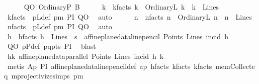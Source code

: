 \begin{isabellebody}
\ \ \ \ \isamarkupfalse%
\ QO{\isacharcolon}{\kern0pt}\ {\isacharparenleft}{\kern0pt}OrdinaryP\ B{\isacharparenright}{\kern0pt}\isanewline
\ \ \ \ \isamarkupfalse%
\ k{}\ \ k{}{\isacharunderscore}{\kern0pt}facts{\isacharcolon}{\kern0pt}\ {\isachardoublequoteopen}k\ {\isacharequal}{\kern0pt}\ OrdinaryL\ k{}\ {\isasymand}\ k{}\ {\isasymin}\ Lines{\isachardoublequoteclose}\ \isamarkupfalse%
\ k{\isacharunderscore}{\kern0pt}facts\ \ pLdef\ pm\ PI\ QO\ \isamarkupfalse%
\ auto\isanewline
\ \ \ \ \isamarkupfalse%
\ n{}\ \ n{}{\isacharunderscore}{\kern0pt}facts{\isacharcolon}{\kern0pt}\ {\isachardoublequoteopen}n\ {\isacharequal}{\kern0pt}\ OrdinaryL\ n{}\ {\isasymand}\ n{}\ {\isasymin}\ Lines{\isachardoublequoteclose}\ \isamarkupfalse%
\ n{\isacharunderscore}{\kern0pt}facts\ \ pLdef\ pm\ PI\ QO\ \isamarkupfalse%
\ auto\isanewline
\isanewline
\ \ \ \ \isamarkupfalse%
\ h\ \ h{\isacharunderscore}{\kern0pt}facts{\isacharcolon}{\kern0pt}\ {\isachardoublequoteopen}h\ {\isasymin}\ Lines\ {\isasymand}\ s\ {\isacharequal}{\kern0pt}\ affine{\isacharunderscore}{\kern0pt}plane{\isacharunderscore}{\kern0pt}data{\isachardot}{\kern0pt}line{\isacharunderscore}{\kern0pt}pencil\ Points\ Lines\ {\isacharparenleft}{\kern0pt}incid{\isacharparenright}{\kern0pt}\ h{\isachardoublequoteclose}\ \ \isamarkupfalse%
\ QO\ pPdef\ pq{\isacharunderscore}{\kern0pt}pts\ PI\ \isamarkupfalse%
\ blast\isanewline
\ \ \ \ \isamarkupfalse%
\ hk{}{\isacharcolon}{\kern0pt}\ {\isachardoublequoteopen}affine{\isacharunderscore}{\kern0pt}plane{\isacharunderscore}{\kern0pt}data{\isachardot}{\kern0pt}parallel\ Points\ Lines\ {\isacharparenleft}{\kern0pt}incid{\isacharparenright}{\kern0pt}\ h\ k{}{\isachardoublequoteclose}\isanewline
\ \ \ \ \isamarkupfalse%
\ {\isacharparenleft}{\kern0pt}metis\ Ap{}{}\ PI\ affine{\isacharunderscore}{\kern0pt}plane{\isacharunderscore}{\kern0pt}data{\isachardot}{\kern0pt}line{\isacharunderscore}{\kern0pt}pencil{\isacharunderscore}{\kern0pt}def\ ap\ h{\isacharunderscore}{\kern0pt}facts\ k{}{\isacharunderscore}{\kern0pt}facts\ k{\isacharunderscore}{\kern0pt}facts\ mem{\isacharunderscore}{\kern0pt}Collect{\isacharunderscore}{\kern0pt}eq\ mprojectivize{\isachardot}{\kern0pt}simps{\isacharparenleft}{\kern0pt}{}{\isacharparenright}{\kern0pt}\ pm\isanewline

\end{isabellebody}
